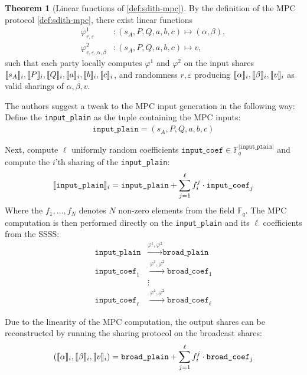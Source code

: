 \documentclass[11pt]{report}
\theoremstyle{definition}
\newtheorem{theorem}{Theorem}[section]
\theoremstyle{plain}
\begin{document}
\begin{theorem}[Linear functions of \autoref{def:sdith-mpc}]\label{thm:sdith-mpc-linear}
  By the definition of the MPC protocol \autoref{def:sdith-mpc}, there exist linear functions
  \begin{align}
    \varphi^1_{r,\varepsilon}                 & : (s_A, P, Q, a, b, c) \mapsto (\alpha, \beta), \\
    \varphi^2_{r, \varepsilon, \alpha, \beta} & : (s_A, P, Q, a, b, c) \mapsto v,
  \end{align}
  such that each party locally computes $\varphi^1$ and $\varphi^2$ on the input shares $\llbracket s_A \rrbracket_i, \llbracket P \rrbracket_i, \llbracket Q \rrbracket_i, \llbracket a \rrbracket_i, \llbracket b \rrbracket_i, \llbracket c \rrbracket_i$, and randomness $r, \varepsilon$ producing $\llbracket \alpha \rrbracket_i, \llbracket \beta \rrbracket_i, \llbracket v \rrbracket_i$ as valid sharings of $\alpha, \beta, v$.
\end{theorem}

The authors suggest a tweak to the MPC input generation in the following way: Define the \texttt{input\_plain} as the tuple containing the MPC inputs:
\begin{align*}
  \texttt{input\_plain} = (s_A, P, Q, a, b, c)
\end{align*}

Next, compute $\ell$ uniformly random coefficients $\texttt{input\_coef} \in \mathbb{F}_q^{|\texttt{input\_plain}|}$ and compute the $i$'th sharing of the \texttt{input\_plain}:
\begin{align}\label{equation:input_sharing}
  \llbracket \texttt{input\_plain} \rrbracket_i = \texttt{input\_plain} + \sum_{j=1}^\ell f_i^j \cdot \texttt{input\_coef}_j
\end{align}
Where the $f_1,\dots,f_N$ denotes $N$ non-zero elements from the field $\mathbb{F}_q$.
The MPC computation is then performed directly on the \texttt{input\_plain} and its $\ell$ coefficients from the SSSS:
\begin{align*}
  \texttt{input\_plain}     & \stackrel{\varphi^1, \varphi^2}{\longrightarrow} \texttt{broad\_plain}     \\
  \texttt{input\_coef}_1    & \stackrel{\varphi^1, \varphi^2}{\longrightarrow} \texttt{broad\_coef}_1    \\
                            & \vdots                                                                     \\
  \texttt{input\_coef}_\ell & \stackrel{\varphi^1, \varphi^2}{\longrightarrow} \texttt{broad\_coef}_\ell
\end{align*}

Due to the linearity of the MPC computation, the output shares can be reconstructed by running the sharing protocol on the broadcast shares:
\begin{align}\label{equation:input_sharing_reverse}
  (\llbracket \alpha \rrbracket_i, \llbracket \beta \rrbracket_i, \llbracket v \rrbracket_i) = \texttt{broad\_plain} + \sum_{j=1}^\ell f_i^j \cdot \texttt{broad\_coef}_j
\end{align}
\end{document}
